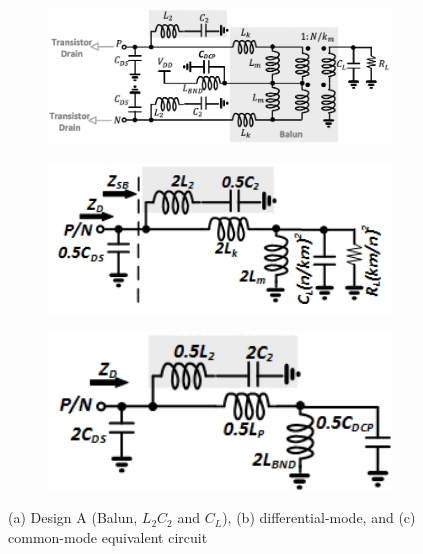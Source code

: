 \documentclass[conference]{IEEEtran}
\begin{document}
\begin{figure}[!t]
\captionsetup{font=footnotesize}
\centering
\begin{subfigure}{0.5\textwidth}
\centering
\includegraphics[width=1\textwidth]{Images/Design/Design_A_FC.pdf}
\caption{}
\label{fig:Design_A_FC}
\end{subfigure}
\begin{subfigure}[b]{0.24\textwidth}
\includegraphics[width=1\textwidth]{Images/Design/Design_A_Diff.jpg}
\caption{}
\label{fig:Design_A_Diff}
\end{subfigure}
\begin{subfigure}[b]{0.24\textwidth}
\includegraphics[width=1\textwidth]{Images/Design/Design_A_Com.jpg}
\caption{}
\label{fig:Design_A_Com}
\end{subfigure}
\caption{(a) Design A (Balun, $L_2C_2$ and $C_L$), (b) differential-mode, and (c) common-mode equivalent circuit }
\label{fig:Design_A}
\vspace{-0.2in}
\end{figure}
\end{document}
